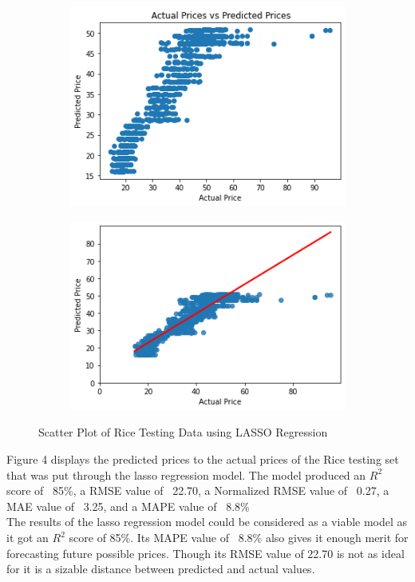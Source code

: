 \documentclass[runningheads]{llncs}
\begin{document}
\begin{figure}
	\begin{subfigure}{.5\textwidth}
		\centering
		\includegraphics[width=.8\linewidth]{FIGURES/lass_test1.png}
		
	\end{subfigure}%
	\begin{subfigure}{.5\textwidth}
		\centering
		\includegraphics[width=.8\linewidth]{FIGURES/lass_test2.png}
		
	\end{subfigure}
	\caption{Scatter Plot of Rice Testing Data using LASSO Regression}
\end{figure}

Figure 4 displays the predicted prices to the actual prices of the Rice testing set that was put through the lasso regression model. The model produced an $R^2$ score of ~85\%, a RMSE value of ~22.70, a Normalized RMSE value of ~0.27, a MAE value of ~3.25, and a MAPE value of ~8.8\% \\

The results of the lasso regression model could be considered as a viable model as it got an $R^2$ score of 85\%. Its MAPE value of ~8.8\% also gives it enough merit for forecasting future possible prices. Though its RMSE value of 22.70 is not as ideal for it is a sizable distance between predicted and actual values.
\end{document}
